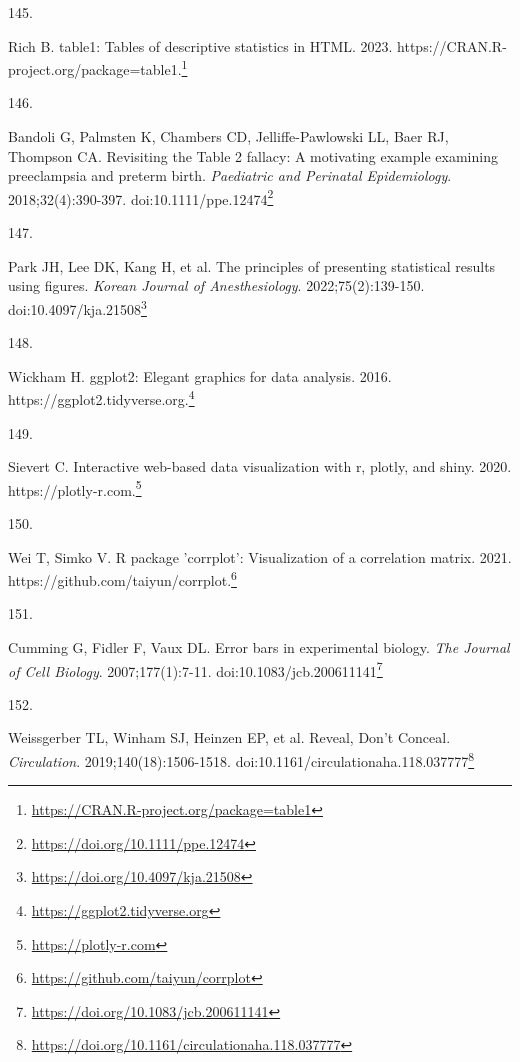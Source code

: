 \documentclass[
  a4paper,
]{book}
\newlength{\cslhangindent}
\newlength{\csllabelwidth}
\newlength{\cslentryspacingunit} %
\newenvironment{CSLReferences}[2] %
 {%
  \setlength{\parindent}{0pt}
  \ifodd #1
  \let\oldpar\par
  \def\par{\hangindent=\cslhangindent\oldpar}
  \fi
  \setlength{\parskip}{#2\cslentryspacingunit}
 }%
 {}
\newcommand{\CSLLeftMargin}[1]{\parbox[t]{\csllabelwidth}{#1}}
\newcommand{\CSLRightInline}[1]{\parbox[t]{\linewidth - \csllabelwidth}{#1}\break}
\renewcommand{\href}[2]{#2\footnote{\url{#1}}}
\begin{document}
\begin{CSLReferences}{0}{0}
\leavevmode{}%
\CSLLeftMargin{145. }%
\CSLRightInline{Rich B. table1: Tables of descriptive statistics in HTML. 2023. \href{https://CRAN.R-project.org/package=table1}{https://CRAN.R-project.org/package=table1.}}

\leavevmode{}%
\CSLLeftMargin{146. }%
\CSLRightInline{Bandoli G, Palmsten K, Chambers CD, Jelliffe-Pawlowski LL, Baer RJ, Thompson CA. Revisiting the Table 2 fallacy: A motivating example examining preeclampsia and preterm birth. \emph{Paediatric and Perinatal Epidemiology}. 2018;32(4):390-397. doi:\href{https://doi.org/10.1111/ppe.12474}{10.1111/ppe.12474}}

\leavevmode{}%
\CSLLeftMargin{147. }%
\CSLRightInline{Park JH, Lee DK, Kang H, et al. The principles of presenting statistical results using figures. \emph{Korean Journal of Anesthesiology}. 2022;75(2):139-150. doi:\href{https://doi.org/10.4097/kja.21508}{10.4097/kja.21508}}

\leavevmode{}%
\CSLLeftMargin{148. }%
\CSLRightInline{Wickham H. ggplot2: Elegant graphics for data analysis. 2016. \href{https://ggplot2.tidyverse.org}{https://ggplot2.tidyverse.org.}}

\leavevmode{}%
\CSLLeftMargin{149. }%
\CSLRightInline{Sievert C. Interactive web-based data visualization with r, plotly, and shiny. 2020. \href{https://plotly-r.com}{https://plotly-r.com.}}

\leavevmode{}%
\CSLLeftMargin{150. }%
\CSLRightInline{Wei T, Simko V. R package 'corrplot': Visualization of a correlation matrix. 2021. \href{https://github.com/taiyun/corrplot}{https://github.com/taiyun/corrplot.}}

\leavevmode{}%
\CSLLeftMargin{151. }%
\CSLRightInline{Cumming G, Fidler F, Vaux DL. Error bars in experimental biology. \emph{The Journal of Cell Biology}. 2007;177(1):7-11. doi:\href{https://doi.org/10.1083/jcb.200611141}{10.1083/jcb.200611141}}

\leavevmode{}%
\CSLLeftMargin{152. }%
\CSLRightInline{Weissgerber TL, Winham SJ, Heinzen EP, et al. Reveal, Don{'}t Conceal. \emph{Circulation}. 2019;140(18):1506-1518. doi:\href{https://doi.org/10.1161/circulationaha.118.037777}{10.1161/circulationaha.118.037777}}


\end{CSLReferences}
\end{document}
